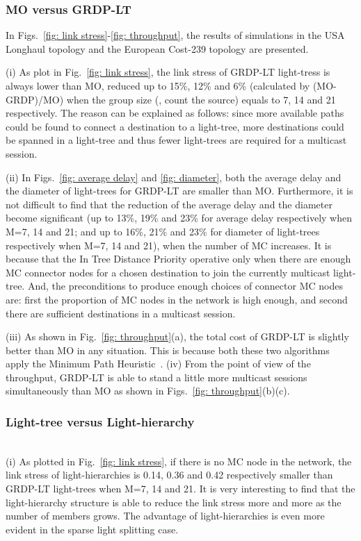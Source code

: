 \documentclass[conference]{IEEEtran}
\begin{document}
\subsubsection{MO versus GRDP-LT}
\label{subsubsec: MO versus GRDP-LT}

In Figs.~\ref{fig: link stress}-\ref{fig: throughput}, the results of simulations in the USA Longhaul topology and the European Cost-239 topology are presented.

(i) As plot in Fig.~\ref{fig: link stress}, the link stress of GRDP-LT light-tress is always lower than MO, reduced up to 15\%, 12\% and 6\% (calculated by (MO-GRDP)/MO) when the group size (, count the source) equals to 7, 14 and 21 respectively. The reason can be explained as follows: since more available paths could be found to connect a destination to a light-tree, more destinations could be spanned in a light-tree and thus fewer light-trees are required for a multicast session.

(ii) In Figs.~\ref{fig: average delay} and \ref{fig: diameter}, both the average delay and the diameter of light-trees for GRDP-LT are smaller than MO. Furthermore, it is not difficult to find that the reduction of the average delay and the diameter become significant (up to 13\%, 19\% and 23\% for average delay respectively when M=7, 14 and 21; and up to 16\%, 21\% and 23\% for diameter of light-trees respectively when M=7, 14 and 21), when the number of MC increases. It is because that the In Tree Distance Priority operative only when there are enough MC connector nodes for a chosen destination to join the currently multicast light-tree. And, the preconditions to produce enough choices of connector MC nodes are: first the proportion of MC nodes in the network is high enough, and second there are sufficient destinations in a multicast session.

(iii) As shown in Fig.~\ref{fig: throughput}(a), the total cost of GRDP-LT is slightly better than MO in any situation. This is because both these two algorithms apply the Minimum Path Heuristic~\cite{hTakahashi1980}.
(iv) From the point of view of the throughput, GRDP-LT is able to stand a little more multicast sessions simultaneously than MO as shown in Figs.~\ref{fig: throughput}(b)(c).

\subsubsection{Light-tree versus Light-hierarchy}
\label{subsubsec: Light-tree versus Light-hierarchy}
~\\
(i) As plotted in Fig.~\ref{fig: link stress}, if there is no MC node in the network, the link stress of light-hierarchies is 0.14, 0.36 and 0.42 respectively smaller than GRDP-LT light-trees when M=7, 14 and 21. It is very interesting to find that the light-hierarchy structure is able to reduce the link stress more and more as the number of members grows. The advantage of light-hierarchies is even more evident in the sparse light splitting case.
\end{document}
